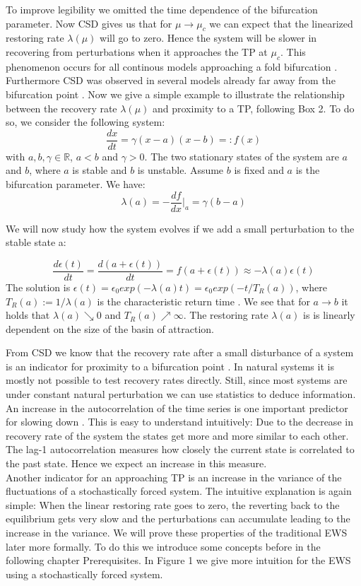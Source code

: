 \documentclass[%
thesis=student,%
coverpage=false,%
titlepage=false,%
headmarks=true, %
german,%
font=libertine, %
math=newpxtx, %
BCOR=5mm,%
coverBCOR=11mm%
]{tumbook}
\begin{document}
To improve legibility we omitted the time dependence of the bifurcation parameter. Now CSD gives us that for $\mu \rightarrow \mu_{c}$ we can expect that the linearized restoring rate $\lambda(\mu)$ will go to zero. Hence the system will be slower in recovering from perturbations when it approaches the TP at $\mu_{c}$. This phenomenon occurs for all continous models approaching a fold bifurcation \cite{Wissel:1984}. Furthermore CSD was observed in several models already far away from the bifurcation point \cite{VanNes:2007}. Now we give a simple example to illustrate the relationship between the recovery rate $\lambda(\mu)$ and proximity to a TP, following \cite{Scheffer:2009} Box 2. To do so, we consider the following system: 
\begin{equation}
    \frac{dx}{dt} = \gamma (x-a)(x-b) =: f(x) \label{eq:1}
\end{equation}
with $a,b,\gamma \in \mathbb{R}$, $a < b$ and $\gamma > 0$. The two stationary states of the system are $a$ and $b$, where $a$ is stable and $b$ is unstable. Assume $b$ is fixed and $a$ is the bifurcation parameter.
We have: 
\[\lambda (a) = -\frac{df}{dx}|_{a} = \gamma(b-a)\] 

We will now study how the system evolves if we add a small perturbation to the stable state a:

\[
\frac{d\epsilon(t)}{dt} = \frac{d(a + \epsilon(t))}{dt} = f(a + \epsilon(t)) \approx 
 -\lambda(a)\epsilon(t)
\]
The solution is $\epsilon(t) = \epsilon_{0}exp(-\lambda(a)t) = \epsilon_{0}exp(-t/T_{R}(a))$, where $T_{R}(a) := 1/ \lambda(a)$ is the characteristic return time \cite{Wissel:1984}.
We see that for $a \rightarrow b$ it holds that $\lambda(a) \searrow 0$ and $T_{R}(a)\nearrow \infty$. The restoring rate $\lambda(a)$ is is linearly dependent on the size of the basin of attraction.

From CSD we know that the recovery rate after a small disturbance of a system is an indicator for proximity to a bifurcation point \cite{VanNes:2007}. In natural systems it is mostly not possible to test recovery rates directly. Still, since most systems are under constant natural perturbation we can use statistics to deduce information. An increase in the autocorrelation of the time series is one important predictor for slowing down \cite{Ives:1995}. This is easy to understand intuitively: Due to the decrease in recovery rate of the system the states get more and more similar to each other. The lag-1 autocorrelation measures how closely the current state is correlated to the past state. Hence we expect an increase in this measure. \\
Another indicator for an approaching TP is an increase in the variance of the fluctuations of a stochastically forced system. The intuitive explanation is again simple: When the linear restoring rate goes to zero, the reverting back to the equilibrium gets very slow and the perturbations can accumulate leading to the increase in the variance. 
We will prove these properties of the traditional EWS later more formally. To do this we introduce some concepts before in the following chapter Prerequisites. In Figure 1 we give more intuition for the EWS using a stochastically forced system. \\
\end{document}
